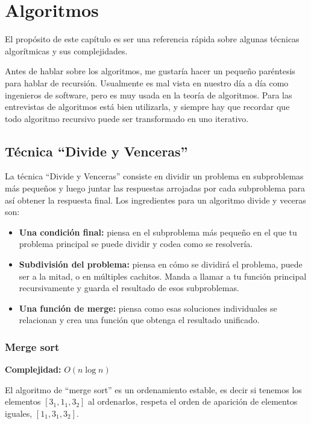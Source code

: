 \chapter{Algoritmos}

El propósito de este capítulo es ser una referencia rápida sobre algunas técnicas algorítmicas y sus complejidades.

Antes de hablar sobre los algoritmos, me gustaría hacer un pequeño paréntesis para hablar de recursión. Usualmente es mal vista en nuestro día a día como ingenieros de software, pero es muy usada en la teoría de algoritmos. Para las entrevistas de algoritmos está bien utilizarla, y siempre hay que recordar que todo algoritmo recursivo puede ser transformado en uno iterativo.

\section{Técnica ``Divide y Venceras''}

La técnica ``Divide y Venceras'' consiste en dividir un problema en subproblemas más pequeños y luego juntar las respuestas arrojadas por cada subproblema para así obtener la respuesta final. Los ingredientes para un algoritmo divide y veceras son:

\begin{itemize}
    \item \textbf{Una condición final:} piensa en el subproblema más pequeño en el que tu problema principal se puede dividir y codea como se resolvería.
    \item \textbf{Subdivisión del problema:} piensa en cómo se dividirá el problema, puede ser a la mitad, o en múltiples cachitos. Manda a llamar a tu función principal recursivamente y guarda el resultado de esos subproblemas.
    \item \textbf{Una función de merge:} piensa como esas soluciones individuales se relacionan y crea una función que obtenga el resultado unificado.
\end{itemize}

\subsection{Merge sort}

\textbf{Complejidad:} $O(n \log n)$

El algoritmo de ``merge sort'' es un ordenamiento estable, es decir si tenemos los elementos $[3_1, 1_1,3_2]$ al ordenarlos, respeta el orden de aparición de elementos iguales, $[1_1,3_1,3_2]$.

